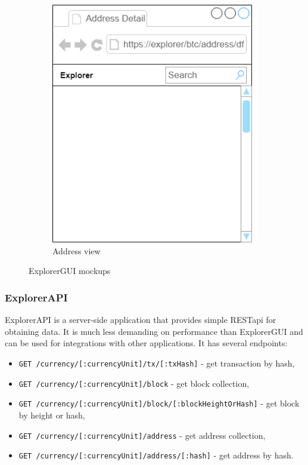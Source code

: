 \begin{figure}[h]
\begin{subfigure}{.5\textwidth}
        \includegraphics[width=1.0\linewidth]{mockups/address.png}
        \caption{Address view}
        \label{addressMockup}
    \end{subfigure}
    \caption{ExplorerGUI mockups}
\end{figure}

\subsubsection{ExplorerAPI}
\label{explorerAPIroutes}
ExplorerAPI is a server-side application that provides simple RESTapi for obtaining data. It is much less demanding on performance than ExplorerGUI and can be used for integrations with other applications. It has several endpoints:
\begin{itemize}
    \item \texttt{GET /currency/[:currencyUnit]/tx/[:txHash]} - get transaction by hash,
    \item \texttt{GET /currency/[:currencyUnit]/block} - get block collection,
    \item \texttt{GET /currency/[:currencyUnit]/block/[:blockHeightOrHash]} - get block by height or hash,
    \item \texttt{GET /currency/[:currencyUnit]/address} - get address collection,
    \item \texttt{GET /currency/[:currencyUnit]/address/[:hash]} - get address by hash.
\end{itemize}

